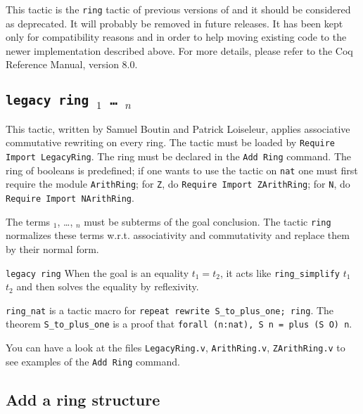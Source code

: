 
\Warning This tactic is the {\tt ring} tactic of previous versions of
\Coq{} and it should be considered as deprecated. It will probably be
removed in future releases. It has been kept only for compatibility
reasons and in order to help moving existing code to the newer
implementation described above. For more details, please refer to the
Coq Reference Manual, version 8.0.


\subsection{\tt legacy ring \term$_1$ \dots\ \term$_n$
}

This tactic, written by Samuel Boutin and Patrick Loiseleur, applies
associative commutative rewriting on every ring.  The tactic must be
loaded by \texttt{Require Import LegacyRing}. The ring must be declared in
the \texttt{Add Ring} command. The ring of booleans
is predefined; if one wants to use the tactic on \texttt{nat} one must
first require the module \texttt{ArithRing}; for \texttt{Z}, do
\texttt{Require Import ZArithRing}; for \texttt{N}, do \texttt{Require
Import NArithRing}.

The terms \term$_1$, \dots, \term$_n$ must be subterms of the goal
conclusion. The tactic \texttt{ring} normalizes these terms
w.r.t. associativity and commutativity and replace them by their
normal form.

\begin{Variants}
\item \texttt{legacy ring} When the goal is an equality $t_1=t_2$, it
  acts like \texttt{ring\_simplify} $t_1$ $t_2$ and then
  solves the equality by reflexivity.

\item \texttt{ring\_nat} is a tactic macro for \texttt{repeat rewrite
    S\_to\_plus\_one; ring}. The theorem \texttt{S\_to\_plus\_one} is a
  proof that \texttt{forall (n:nat), S n = plus (S O) n}.

\end{Variants}

You can have a look at the files \texttt{LegacyRing.v},
\texttt{ArithRing.v}, \texttt{ZArithRing.v} to see examples of the
\texttt{Add Ring} command.

\subsection{Add a ring structure}

